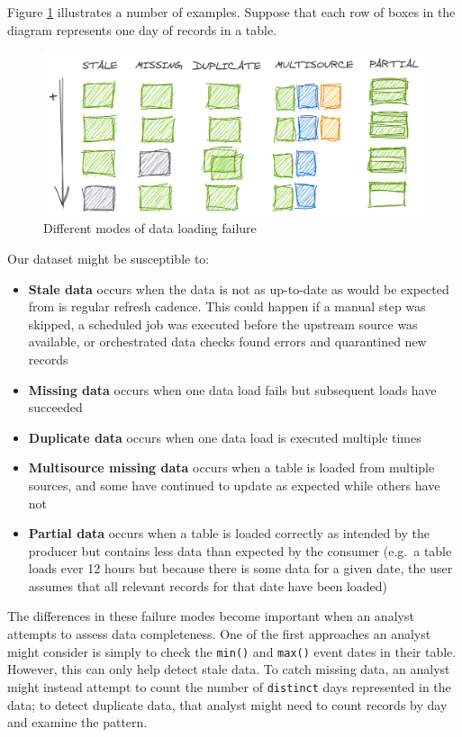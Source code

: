 \documentclass[
]{krantz}
\providecommand{\tightlist}{%
  \setlength{\itemsep}{0pt}\setlength{\parskip}{0pt}}
\begin{document}
Figure \ref{fig:data-load} illustrates a number of examples. Suppose that each row of boxes in the diagram represents one day of records in a table.

\begin{figure}

{\centering \includegraphics[width=0.9\linewidth]{figures/data-dall/data-load} 

}

\caption{Different modes of data loading failure}\label{fig:data-load}
\end{figure}

Our dataset might be susceptible to:

\begin{itemize}
\tightlist
\item
  \textbf{Stale data} occurs when the data is not as up-to-date as would be expected from is regular refresh cadence. This could happen if a manual step was skipped, a scheduled job was executed before the upstream source was available, or orchestrated data checks found errors and quarantined new records
\item
  \textbf{Missing data} occurs when one data load fails but subsequent loads have succeeded
\item
  \textbf{Duplicate data} occurs when one data load is executed multiple times
\item
  \textbf{Multisource missing data} occurs when a table is loaded from multiple sources, and some have continued to update as expected while others have not
\item
  \textbf{Partial data} occurs when a table is loaded correctly as intended by the producer but contains less data than expected by the consumer (e.g.~a table loads ever 12 hours but because there is some data for a given date, the user assumes that all relevant records for that date have been loaded)
\end{itemize}

The differences in these failure modes become important when an analyst attempts to assess data completeness.
One of the first approaches an analyst might consider is simply to check the \texttt{min()} and \texttt{max()} event dates in their table.
However, this can only help detect stale data.
To catch missing data, an analyst might instead attempt to count the number of \texttt{distinct} days represented in the data; to detect duplicate data, that analyst might need to count records by day and examine the pattern.
\end{document}
